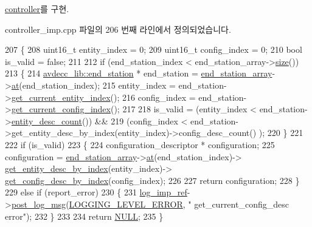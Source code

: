 \hyperlink{classavdecc__lib_1_1controller_af249ed146464b54d7fc9d87f67bcff46}{controller}를 구현.



controller\+\_\+imp.\+cpp 파일의 206 번째 라인에서 정의되었습니다.


\begin{DoxyCode}
207 \{
208     uint16\_t entity\_index = 0;
209     uint16\_t config\_index = 0;
210     \textcolor{keywordtype}{bool} is\_valid = \textcolor{keyword}{false};
211 
212     \textcolor{keywordflow}{if} (end\_station\_index < end\_station\_array->\hyperlink{gst__avb__playbin_8c_a439227feff9d7f55384e8780cfc2eb82}{size}())
213     \{
214         \hyperlink{classavdecc__lib_1_1end__station}{avdecc\_lib::end\_station} * end\_station = 
      \hyperlink{classavdecc__lib_1_1controller__imp_a17c6518dbb728acdcd1c4e78d7bc1c5a}{end\_station\_array}->\hyperlink{classavdecc__lib_1_1end__stations_a8b2053474417f106d063017c5b60bad2}{at}(end\_station\_index);
215         entity\_index = end\_station->\hyperlink{classavdecc__lib_1_1end__station_aaf7e2defcfdf88c62c04fd88bd49787d}{get\_current\_entity\_index}();
216         config\_index = end\_station->\hyperlink{classavdecc__lib_1_1end__station_abaf546b5bb641dcf161f895e3d6d8cd8}{get\_current\_config\_index}();
217 
218         is\_valid = (entity\_index < end\_station->\hyperlink{classavdecc__lib_1_1end__station_a14c0322d46a8800dbb4908716db50d86}{entity\_desc\_count}()) &&
219                    (config\_index < end\_station->get\_entity\_desc\_by\_index(entity\_index)->config\_desc\_count()
      );
220     \}
221 
222     \textcolor{keywordflow}{if} (is\_valid)
223     \{
224         configuration\_descriptor * configuration;
225         configuration = \hyperlink{classavdecc__lib_1_1controller__imp_a17c6518dbb728acdcd1c4e78d7bc1c5a}{end\_station\_array}->\hyperlink{classavdecc__lib_1_1end__stations_a8b2053474417f106d063017c5b60bad2}{at}(end\_station\_index)->
      \hyperlink{classavdecc__lib_1_1end__station__imp_a2039add3a7eb753152149e07a86ad008}{get\_entity\_desc\_by\_index}(entity\_index)->
      \hyperlink{classavdecc__lib_1_1entity__descriptor_a03bd82c580f2f1d3596d936033edaeba}{get\_config\_desc\_by\_index}(config\_index);
226 
227         \textcolor{keywordflow}{return} configuration;
228     \}
229     \textcolor{keywordflow}{else} \textcolor{keywordflow}{if} (report\_error)
230     \{
231         \hyperlink{namespaceavdecc__lib_acbe3e2a96ae6524943ca532c87a28529}{log\_imp\_ref}->\hyperlink{classavdecc__lib_1_1log_a68139a6297697e4ccebf36ccfd02e44a}{post\_log\_msg}(\hyperlink{namespaceavdecc__lib_a501055c431e6872ef46f252ad13f85cdaf2c4481208273451a6f5c7bb9770ec8a}{LOGGING\_LEVEL\_ERROR}, \textcolor{stringliteral}{"
      get\_current\_config\_desc error"});
232     \}
233 
234     \textcolor{keywordflow}{return} \hyperlink{openavb__types__base__pub_8h_a070d2ce7b6bb7e5c05602aa8c308d0c4}{NULL};
235 \}
\end{DoxyCode}


